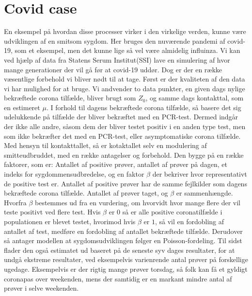 \section*{Covid case}
En eksempel på hvordan  disse processer virker i den virkelige verden, kunne være udviklingen af en smitsom sygdom.
Her bruges den nuværende pandemi af covid-19, som et eksempel, men det kunne lige så vel være almidelig influinza.
Vi kan ved hjælp af data fra Statens Serum Institut(SSI) lave en simulering af hvor mange generationer der vil gå før at covid-19 uddør.
Dog er der en række væsentlige forbehold vi bliver nødt til at tage. 
Først er der kvaliteten af den data vi har mulighed for at bruge.
Vi andvender to data punkter, en given dags nylige bekræftede corona tilfælde, bliver brugt som $Z_0$, og samme dags kontakttal, som en estimeret $\mu$.
I forhold til dagens bekræftede corona tilfælde, så basere det sig udelukkende på tilfælde der bliver bekræftet med en PCR-test. Dermed indgår der ikke alle andre, såsom dem der bliver testet positiv i en anden type test, men som ikke bekræfter det med en PCR-test, eller asymptomatiske corona tilfælde.
Med hensyn til kontakttallet, så er kotaktallet selv en modulering af smitteudbruddet, med en række antagelser og forbehold.
Den bygge på en række faktorer, som er: Antallet af positive prøver, antallet af prøver på dagen, et indeks for sygdommensudbredelse, og en faktor $\beta$ der bekriver hvor representativt de positive test er.
 Antallet af positive prøver har de samme fejlkilder som dagens bekræftede corona tilfælde.
 Antallet af prøver taget, og $\beta$ er sammenhængde. Hvorfra $\beta$ bestemmes ud fra en vurdering, om hvorvidt hvor mange flere der vil teste positivt ved flere test. Hvis $\beta$ er $0$ så er alle positive coronatilfælde i populationen er blevet testet, hvorimod hvis $\beta$ er $1$, så vil en fordobling af antallet af test, medføre en fordobling af antallet bekræftede tilfælde.
Derudover så antager modellen at sygdomsudviklingen følger en Poisson-fordeling.
Til sidst flader den også estimatet ud baseret på de seneste syv dages resultater, for at undgå ekstreme resultater, ved eksempelvis varienrende antal prøver på forskellige ugedage. Eksempelvis er der rigtig mange prøver torsdag, så folk kan få et gyldigt coronapas over weekenden, mens der samtidig er en markant mindre antal af prøver i selve weekenden.
